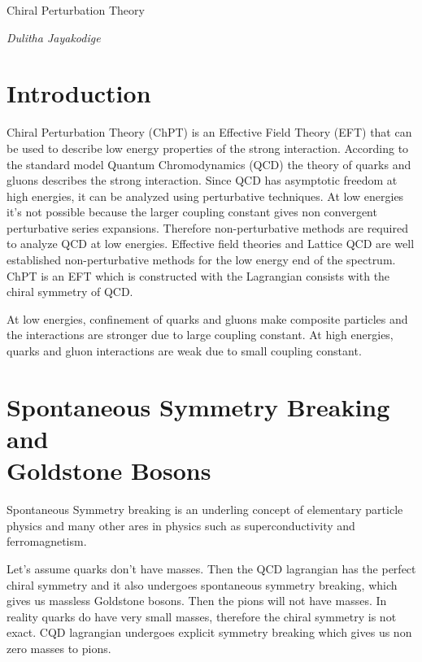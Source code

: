 \documentclass{article}
\begin{document}
\centerline{\sc \LARGE Chiral Perturbation Theory}
\vspace{.5pc}
\centerline{\it Dulitha Jayakodige} 
\vspace{2pc}

\section {Introduction}


Chiral Perturbation Theory (ChPT) is an Effective Field Theory (EFT) that can be used to describe low energy properties of the strong interaction. According to the standard model Quantum Chromodynamics (QCD) the theory of quarks and gluons describes the strong interaction. Since QCD has asymptotic freedom at high energies, it can be analyzed using perturbative techniques. At low energies it's not possible because the larger coupling constant gives non convergent perturbative series expansions. Therefore non-perturbative methods are required to analyze QCD at low energies. Effective field theories and Lattice QCD are well established non-perturbative methods for the low energy end of the spectrum. ChPT is an EFT which is constructed with the Lagrangian consists with the chiral symmetry of QCD.



At low energies, confinement of quarks and gluons make composite particles and the interactions are stronger due to large coupling constant. At high energies, quarks and gluon interactions are weak due to small coupling constant. 










\newpage
\section{Spontaneous Symmetry Breaking and \\ Goldstone Bosons}

Spontaneous Symmetry breaking is an underling concept of elementary particle physics and many other ares in physics such as superconductivity and ferromagnetism. 

Let's assume quarks don't have masses. Then the QCD lagrangian has the perfect chiral symmetry and it also undergoes spontaneous symmetry breaking, which gives us massless Goldstone bosons. Then the pions will not have masses. In reality quarks do have very small masses, therefore the chiral symmetry is not exact. CQD lagrangian undergoes explicit symmetry breaking which gives us non zero masses to pions. 
\end{document}
